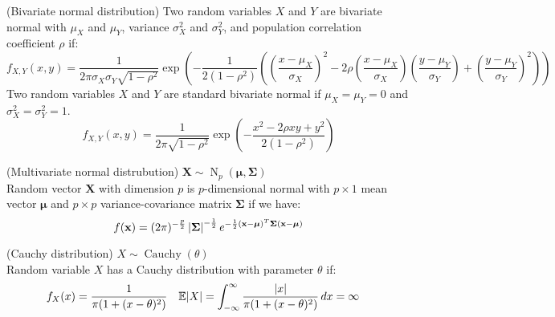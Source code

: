 \documentclass{huhtakm-template-book}
\newcommand{\expect}{\mathbb{E}}
\DeclareMathOperator{\N}{N}
\DeclareMathOperator{\Cauchy}{Cauchy}
\begin{document}
\begin{seg}(Bivariate normal distribution)
	Two random variables $X$ and $Y$ are bivariate normal with $\mu_{X}$ and $\mu_{Y}$, variance $\sigma_{X}^{2}$ and $\sigma_{Y}^{2}$, and population correlation coefficient $\rho$ if:
	\begin{equation*}
		f_{X,Y}(x,y)=\frac{1}{2\pi\sigma_{X}\sigma_{Y}\sqrt{1-\rho^{2}}}\exp\left(-\frac{1}{2(1-\rho^{2})}\left(\left(\frac{x-\mu_{X}}{\sigma_{X}}\right)^{2}-2\rho\left(\frac{x-\mu_{X}}{\sigma_{X}}\right)\left(\frac{y-\mu_{Y}}{\sigma_{Y}}\right)+\left(\frac{y-\mu_{Y}}{\sigma_{Y}}\right)^{2}\right)\right)
	\end{equation*}
	Two random variables $X$ and $Y$ are standard bivariate normal if $\mu_{X}=\mu_{Y}=0$ and $\sigma_{X}^{2}=\sigma_{Y}^{2}=1$.
	\begin{equation*}
		f_{X,Y}(x,y)=\frac{1}{2\pi\sqrt{1-\rho^{2}}}\exp\left(-\frac{x^{2}-2\rho xy+y^{2}}{2(1-\rho^{2})}\right)
	\end{equation*}
\end{seg}
\begin{seg}(Multivariate normal distrubution) $\mathbf{X}\sim\N_{p}(\boldsymbol{\mu},\mathbf{\Sigma})$\\
	Random vector $\mathbf{X}$ with dimension $p$ is $p$-dimensional normal with $p\times 1$ mean vector $\boldsymbol{\mu}$ and $p\times p$ variance-covariance matrix $\mathbf{\Sigma}$ if we have:
	\begin{equation*}
		f(\mathbf{x})=(2\pi)^{-\frac{p}{2}}\left|{\mathbf{\Sigma}}\right|^{-\frac{1}{2}}e^{-\frac{1}{2}(\mathbf{x}-\boldsymbol{\mu})^{T}\mathbf{\Sigma}(\mathbf{x}-\boldsymbol{\mu})}
	\end{equation*}
\end{seg}
\begin{seg}(Cauchy distribution) $X\sim\Cauchy(\theta)$\\
	Random variable $X$ has a Cauchy distribution with parameter $\theta$ if:
	\begin{align*}
		f_{X}(x)&=\frac{1}{\pi(1+(x-\theta)^{2})} & \expect|X|&=\intinfty\frac{|x|}{\pi(1+(x-\theta)^{2})}\,dx=\infty
	\end{align*}
\end{seg}
\end{document}
